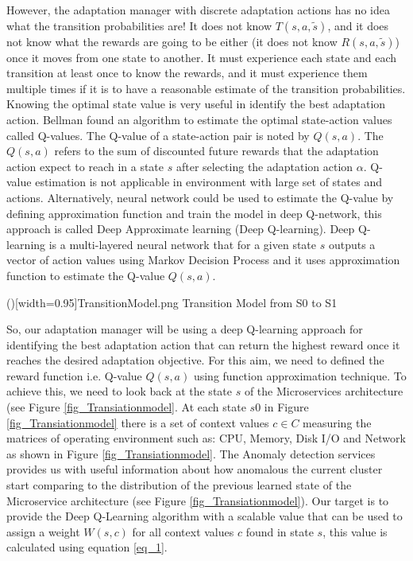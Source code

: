 \documentclass{ieeeaccess}
\begin{document}
 
However, the adaptation manager with discrete adaptation actions  has no idea what the transition probabilities are! It does not know $T(s, a, \tilde{s})$, and it does not know what the rewards are going to be either (it does not know $R(s, a, \tilde{s})$) once it moves from one state to another. It must experience each state and each transition at least once to know the rewards, and it must experience them multiple times if it is to have a reasonable estimate of the transition probabilities.  Knowing the optimal state value is very useful in identify the best adaptation action. Bellman \cite{bellman1957markovian} found an algorithm to estimate the optimal state-action values called Q-values. The Q-value of a state-action pair is noted by $Q(s,a)$. The $Q(s,a)$ refers to the sum of discounted future rewards that the adaptation action expect to reach in a state $s$ after selecting the adaptation action $\alpha$.  Q-value estimation is not applicable in environment with large set of states and actions. Alternatively, neural network could be used to estimate the Q-value by defining approximation function and train the model in deep Q-network, this approach is called Deep Approximate learning (Deep Q-learning). Deep Q-learning is a multi-layered neural network that for a given state $s$ outputs a vector of action values using Markov Decision Process \cite{bellman1957markovian} and it uses approximation function to estimate the Q-value $Q(s, a)$. 

\Figure[!t]()[width=0.95\textwidth]{TransitionModel.png}
   {Transition Model from S0 to S1  \label{fig_Transiationmodel}}
   
So, our adaptation manager will be  using a deep Q-learning approach for identifying the best adaptation action that can return the highest reward once it reaches the desired adaptation objective. For this aim, we need to defined the reward function i.e. Q-value $Q(s,a)$ using function approximation technique. To achieve this, we need to look back at the state $s$ of the Microservices architecture (see Figure \ref{fig_Transiationmodel}. At each state $s0$ in Figure  \ref{fig_Transiationmodel} there is a set of context values $c \in C$ measuring the matrices of operating environment such as: CPU, Memory, Disk I/O and Network  as shown in Figure \ref{fig_Transiationmodel}. The Anomaly detection services provides us with useful information about how anomalous the current cluster start comparing to the distribution of the previous learned state of the Microservice architecture (see Figure \ref{fig_Transiationmodel}). Our target is to provide the Deep Q-Learning algorithm with a scalable value that can be used to assign a weight $W(s,c)$ for all context values $c$ found in state $s$, this value is calculated using equation \ref{eq_1}. 
\end{document}
